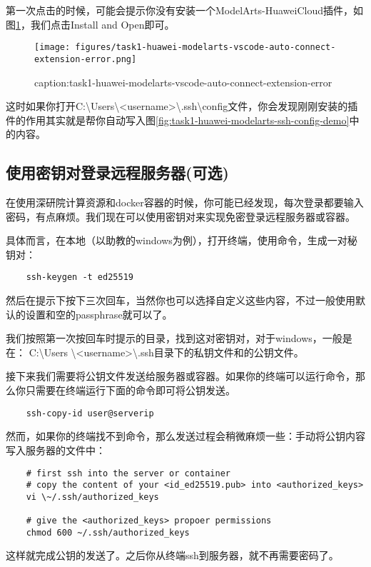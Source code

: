 第一次点击的时候，可能会提示你没有安装一个ModelArts-HuaweiCloud插件，如图\ref{fig:task1-huawei-modelarts-vscode-auto-connect-extension-error}，我们点击Install and Open即可。




\begin{figure}[htbp]
	\centering
	\texttt{[image: figures/task1-huawei-modelarts-vscode-auto-connect-extension-error.png]}
	\caption{caption:task1-huawei-modelarts-vscode-auto-connect-extension-error}
	\label{fig:task1-huawei-modelarts-vscode-auto-connect-extension-error}
\end{figure}

这时如果你打开C:\textbackslash Users\textbackslash <username>\textbackslash .ssh\textbackslash config文件，你会发现刚刚安装的插件的作用其实就是帮你自动写入图\ref{fig:task1-huawei-modelarts-ssh-config-demo}中的内容。


\subsection{使用密钥对登录远程服务器(可选)}

在使用深研院计算资源和docker容器的时候，你可能已经发现，每次登录都要输入密码，有点麻烦。我们现在可以使用密钥对来实现免密登录远程服务器或容器。

具体而言，在本地（以助教的windows为例），打开终端，使用命令，生成一对秘钥对：
\begin{lstlisting}
    ssh-keygen -t ed25519
\end{lstlisting}
然后在提示下按下三次回车，当然你也可以选择自定义这些内容，不过一般使用默认的设置和空的passphrase就可以了。


我们按照第一次按回车时提示的目录，找到这对密钥对，对于windows，一般是在：
C:\textbackslash Users \textbackslash <username>\textbackslash .ssh目录下的私钥文件和的公钥文件。

接下来我们需要将公钥文件发送给服务器或容器。如果你的终端可以运行命令，那么你只需要在终端运行下面的命令即可将公钥发送。
\begin{lstlisting}
    ssh-copy-id user@serverip
\end{lstlisting}

然而，如果你的终端找不到命令，那么发送过程会稍微麻烦一些：手动将公钥内容写入服务器的文件中：
\begin{lstlisting}
    # first ssh into the server or container
    # copy the content of your <id_ed25519.pub> into <authorized_keys>
    vi \~/.ssh/authorized_keys
    
    # give the <authorized_keys> propoer permissions
    chmod 600 ~/.ssh/authorized_keys    
\end{lstlisting}
这样就完成公钥的发送了。之后你从终端ssh到服务器，就不再需要密码了。


